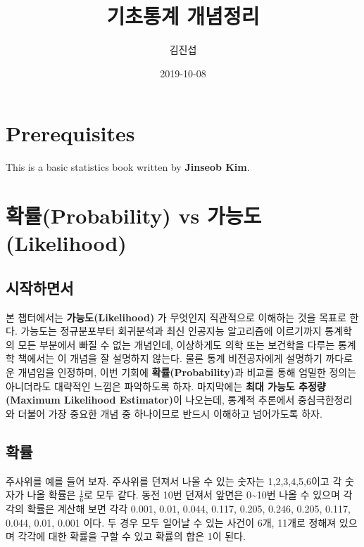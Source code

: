 \documentclass[]{book}
\title{기초통계 개념정리}
\author{김진섭}
\date{2019-10-08}
\begin{document}
\maketitle

{
\setcounter{tocdepth}{1}
\tableofcontents
}
\hypertarget{prerequisites}{%
\chapter{Prerequisites}\label{prerequisites}}

This is a basic statistics book written by \textbf{Jinseob Kim}.

\hypertarget{uxd655uxb960probability-vs-uxac00uxb2a5uxb3c4likelihood}{%
\chapter{확률(Probability) vs 가능도(Likelihood)}\label{uxd655uxb960probability-vs-uxac00uxb2a5uxb3c4likelihood}}

\hypertarget{uxc2dcuxc791uxd558uxba74uxc11c}{%
\section{시작하면서}\label{uxc2dcuxc791uxd558uxba74uxc11c}}

본 챕터에서는 \textbf{가능도(Likelihood)} 가 무엇인지 직관적으로 이해하는 것을 목표로 한다. 가능도는 정규분포부터 회귀분석과 최신 인공지능 알고리즘에 이르기까지 통계학의 모든 부분에서 빠질 수 없는 개념인데, 이상하게도 의학 또는 보건학을 다루는 통계학 책에서는 이 개념을 잘 설명하지 않는다. 물론 통계 비전공자에게 설명하기 까다로운 개념임을 인정하며, 이번 기회에 \textbf{확률(Probability)}과 비교를 통해 엄밀한 정의는 아니더라도 대략적인 느낌은 파악하도록 하자. 마지막에는 \textbf{최대 가능도 추정량(Maximum Likelihood Estimator)}이 나오는데, 통계적 추론에서 중심극한정리와 더불어 가장 중요한 개념 중 하나이므로 반드시 이해하고 넘어가도록 하자.

\hypertarget{uxd655uxb960}{%
\section{확률}\label{uxd655uxb960}}

주사위를 예를 들어 보자. 주사위를 던져서 나올 수 있는 숫자는 1,2,3,4,5,6이고 각 숫자가 나올 확률은 \(\frac{1}{6}\)로 모두 같다. 동전 10번 던져서 앞면은 0\textasciitilde{}10번 나올 수 있으며 각각의 확률은 계산해 보면 각각 0.001, 0.01, 0.044, 0.117, 0.205, 0.246, 0.205, 0.117, 0.044, 0.01, 0.001 이다. 두 경우 모두 일어날 수 있는 사건이 6개, 11개로 정해져 있으며 각각에 대한 확률을 구할 수 있고 확률의 합은 1이 된다.
\end{document}
